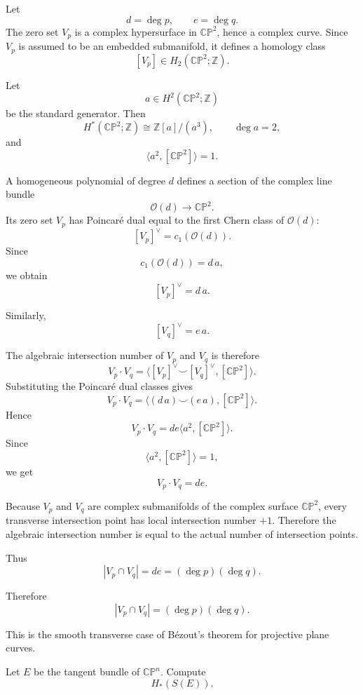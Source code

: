 \begin{solution}
Let
\[
d=\deg p,
\qquad
e=\deg q.
\]
The zero set \(V_p\) is a complex hypersurface in \(\mathbb{CP}^2\), hence a
complex curve. Since \(V_p\) is assumed to be an embedded submanifold, it defines
a homology class
\[
[V_p]\in H_2(\mathbb{CP}^2;\mathbb Z).
\]

Let
\[
a\in H^2(\mathbb{CP}^2;\mathbb Z)
\]
be the standard generator. Then
\[
H^*(\mathbb{CP}^2;\mathbb Z)
\cong
\mathbb Z[a]/(a^3),
\qquad
\deg a=2,
\]
and
\[
\langle a^2,[\mathbb{CP}^2]\rangle=1.
\]

A homogeneous polynomial of degree \(d\) defines a section of the complex line
bundle
\[
\mathcal O(d)\to \mathbb{CP}^2.
\]
Its zero set \(V_p\) has Poincar\'e dual equal to the first Chern class of
\(\mathcal O(d)\):
\[
[V_p]^\vee
=
c_1(\mathcal O(d)).
\]
Since
\[
c_1(\mathcal O(d))=d\,a,
\]
we obtain
\[
[V_p]^\vee=d\,a.
\]

Similarly,
\[
[V_q]^\vee=e\,a.
\]

The algebraic intersection number of \(V_p\) and \(V_q\) is therefore
\[
V_p\cdot V_q
=
\langle [V_p]^\vee\smile [V_q]^\vee,[\mathbb{CP}^2]\rangle.
\]
Substituting the Poincar\'e dual classes gives
\[
V_p\cdot V_q
=
\langle (d\,a)\smile(e\,a),[\mathbb{CP}^2]\rangle.
\]
Hence
\[
V_p\cdot V_q
=
de\langle a^2,[\mathbb{CP}^2]\rangle.
\]
Since
\[
\langle a^2,[\mathbb{CP}^2]\rangle=1,
\]
we get
\[
V_p\cdot V_q=de.
\]

Because \(V_p\) and \(V_q\) are complex submanifolds of the complex surface
\(\mathbb{CP}^2\), every transverse intersection point has local intersection
number \(+1\). Therefore the algebraic intersection number is equal to the actual
number of intersection points.

Thus
\[
|V_p\cap V_q|
=
de
=
(\deg p)(\deg q).
\]

Therefore
\[
\boxed{
	|V_p\cap V_q|=(\deg p)(\deg q).
}
\]

This is the smooth transverse case of B\'ezout's theorem for projective plane
curves.
\end{solution}

\begin{problem}
Let \(E\) be the tangent bundle of \(\mathbb{CP}^n\). Compute
\[
H_*(S(E)).
\]

\par

\noindent
\end{problem}

